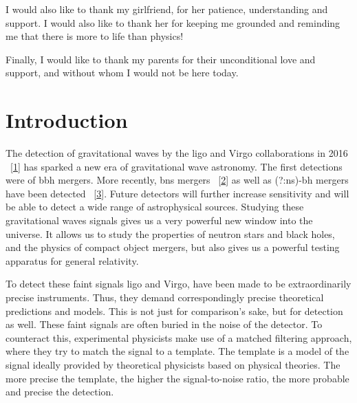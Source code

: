 \documentclass[
  10pt,
  a4paper,
  DIV=11,
  numbers=noendperiod,
  twoside]{scrreprt}
\DeclareRobustCommand{\[}{\begin{equation}}
\DeclareRobustCommand{\]}{\end{equation}}
\begin{document}
I would also like to thank my girlfriend, for her patience,
understanding and support. I would also like to thank her for keeping me
grounded and reminding me that there is more to life than physics!

Finally, I would like to thank my parents for their unconditional love
and support, and without whom I would not be here today.


\hypertarget{introduction}{%
\chapter{Introduction}\label{introduction}}

The detection of gravitational waves by the \gls{ligo} and Virgo
collaborations in 2016
~{[}\protect\hyperlink{ref-LIGOScientific:2016aoc}{1}{]} has sparked a
new era of gravitational wave astronomy. The first detections were of
\gls{bbh} mergers. More recently, \gls{bns} mergers
~{[}\protect\hyperlink{ref-LIGOScientific:2017vwq}{2}{]} as well as
(?:ns)-\gls{bh} mergers have been detected
~{[}\protect\hyperlink{ref-LIGOScientific:2021qlt}{3}{]}. Future
detectors will further increase sensitivity and will be able to detect a
wide range of astrophysical sources. Studying these gravitational waves
signals gives us a very powerful new window into the universe. It allows
us to study the properties of neutron stars and black holes, and the
physics of compact object mergers, but also gives us a powerful testing
apparatus for general relativity.

To detect these faint signals \gls{ligo} and Virgo, have been made to be
extraordinarily precise instruments. Thus, they demand correspondingly
precise theoretical predictions and models. This is not just for
comparison's sake, but for detection as well. These faint signals are
often buried in the noise of the detector. To counteract this,
experimental physicists make use of a matched filtering approach, where
they try to match the signal to a template. The template is a model of
the signal ideally provided by theoretical physicists based on physical
theories. The more precise the template, the higher the signal-to-noise
ratio, the more probable and precise the detection.
\end{document}
